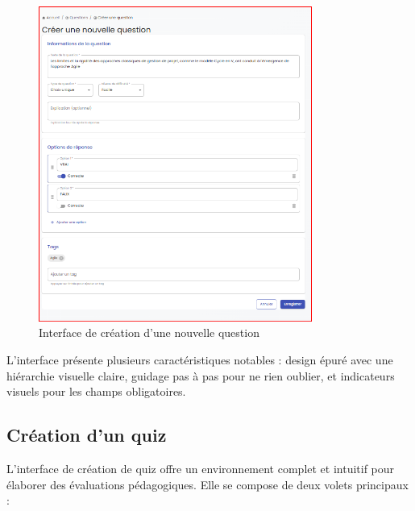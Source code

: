 \documentclass[12pt,a4paper]{report}
\begin{document}
\begin{figure}[H]
\centering
\includegraphics[width=0.8\textwidth]{latex_media/media/image55.png}
\caption{Interface de création d'une nouvelle question}
\label{fig:creation-question}
\end{figure}

L'interface présente plusieurs caractéristiques notables : design épuré avec une hiérarchie visuelle claire, guidage pas à pas pour ne rien oublier, et indicateurs visuels pour les champs obligatoires.

\subsection{Création d'un quiz}

L'interface de création de quiz offre un environnement complet et intuitif pour élaborer des évaluations pédagogiques. Elle se compose de deux volets principaux :
\end{document}
